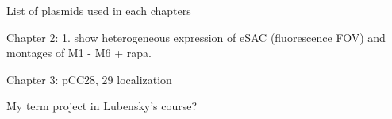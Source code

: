 List of plasmids used in each chapters

Chapter 2: 1. show heterogeneous expression of eSAC (fluorescence FOV) and montages of M1 - M6 + rapa.

Chapter 3: pCC28, 29 localization


My term project in Lubensky's course?